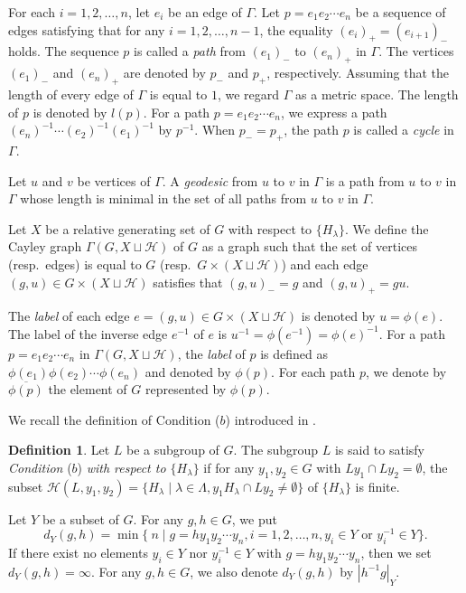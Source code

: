 \documentclass{amsart}
\theoremstyle{definition}
\newtheorem{Def}[Thm]{Definition}
\begin{document}
For each $i=1,2,\ldots,n$, let $e_i$ be an edge of $\Gamma$. 
Let $p=e_1e_2\cdots e_n$ be a sequence of edges satisfying that for any $i=1,2,\ldots, n-1$, the equality $(e_i)_+=(e_{i+1})_-$ holds. 
The sequence $p$ is called a {\it path} from $(e_1)_-$ to $(e_n)_+$ in $\Gamma$. 
The vertices $(e_1)_-$ and $(e_n)_+$ are denoted by $p_-$ and $p_+$, respectively. 
Assuming that the length of every edge of $\Gamma$ is equal to $1$, we regard $\Gamma$ as a metric space. 
The length of $p$ is denoted by $l(p)$. 
For a path $p=e_1e_2\cdots e_n$, we express a path $(e_n)^{-1}\cdots (e_2)^{-1}(e_1)^{-1}$ by $p^{-1}$. 
When $p_-=p_+$, the path $p$ is called a {\it cycle} in $\Gamma$. 

Let $u$ and $v$ be vertices of $\Gamma$. 
A {\it geodesic} from $u$ to $v$ in $\Gamma$ is a path from $u$ to $v$ in $\Gamma$ whose length is minimal in the set of all paths from $u$ to $v$ in $\Gamma$. 

Let $X$ be a relative generating set of $G$ with respect to $\{H_\lambda\}$. 
We define the Cayley graph $\Gamma(G,X\sqcup {\mathcal H})$ of $G$ as a graph such that the set of vertices (resp.\ edges) is equal to $G$ (resp.\ $G\times (X\sqcup {\mathcal H})$) and each edge $(g,u)\in G \times (X\sqcup {\mathcal H})$ satisfies that $(g,u)_-=g$ and $(g,u)_+=gu$. 

The {\it label} of each edge $e=(g,u)\in G\times (X\sqcup {\mathcal H})$ is denoted by $u=\phi(e)$. 
The label of the inverse edge $e^{-1}$ of $e$ is $u^{-1}=\phi(e^{-1})=\phi(e)^{-1}$. 
For a path $p=e_1e_2\cdots e_n$ in $\Gamma(G,X\sqcup{\mathcal H})$, the {\it label} of $p$ is defined as $\phi(e_1)\phi(e_2)\cdots \phi(e_n)$ and denoted by $\phi(p)$. 
For each path $p$, we denote by $\overline{\phi(p)}$ the element of $G$ represented by $\phi(p)$. 
 
We recall the definition of Condition ($b$) introduced in \cite[Definition 1.1]{M-O-Y1}. 

\begin{Def}\label{**}
Let $L$ be a subgroup of $G$. 
The subgroup $L$ is said to satisfy {\it Condition} ($b$) {\it with respect to $\{H_\lambda\}$} if for any $y_1,y_2\in G$ with $Ly_1\cap Ly_2=\emptyset$, the subset ${\mathscr{H}}(L,y_1,y_2)=\{H_{\lambda} \mid \lambda\in\Lambda, y_1H_{\lambda}\cap Ly_2\ne\emptyset\}$ of $\{H_\lambda\}$ is finite. 
\end{Def}

Let $Y$ be a subset of $G$. 
For any $g,h\in G$, we put
\begin{equation*}
d_Y(g,h)=\min\{\ n \mid g=hy_1y_2\cdots y_n, i=1,2,\ldots,n, y_i\in Y \text{ or } y_i^{-1}\in Y \}.
\end{equation*}
If there exist no elements $y_i \in Y$ nor $y_i^{-1}\in Y$ with $g=hy_1y_2\cdots y_n$, then we set $d_Y(g,h)=\infty$. 
For any $g,h\in G$, we also denote $d_Y(g,h)$ by $|h^{-1}g|_Y$.
\end{document}

